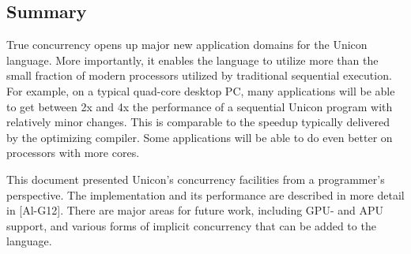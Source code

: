 \subsection*{Summary}

True concurrency opens up major new application domains for the Unicon
language. More importantly, it enables the language to utilize more
than the small fraction of modern processors utilized by traditional
sequential execution. For example, on a typical quad-core desktop PC,
many applications will be able to get between 2x and 4x the performance
of a sequential Unicon program with relatively minor changes. This is
comparable to the speedup typically delivered by the optimizing
compiler. Some applications will be able to do even better on
processors with more cores.

This document presented Unicon{\textquoteright}s concurrency facilities
from a programmer{\textquoteright}s perspective. The implementation and
its performance are described in more detail in [Al-G12]. There are major
areas for future work, including GPU- and APU support, and various
forms of implicit concurrency that can be added to the language.
